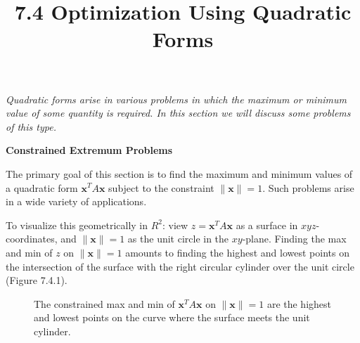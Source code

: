 \documentclass{article}
\title{7.4 Optimization Using Quadratic Forms}
\date{}
\author{}
\newcommand{\redheading}[1]{{\vspace{2mm}\noindent\Large\bfseries\color{red!55!black} #1\par}\vspace{2mm}}
\begin{document}
\maketitle

{\itshape\color{blue!45!black}
Quadratic forms arise in various problems in which the maximum or minimum value of
some quantity is required. In this section we will discuss some problems of this type.\par}

\vspace{2mm}

\redheading{Constrained Extremum Problems}

The primary goal of this section is to find the maximum and minimum values of a
quadratic form $\mathbf{x}^T A\mathbf{x}$ subject to the constraint $\|\mathbf{x}\|=1$.
Such problems arise in a wide variety of applications.

To visualize this geometrically in $R^2$: view $z=\mathbf{x}^T A\mathbf{x}$ as a surface
in $xyz$-coordinates, and $\|\mathbf{x}\|=1$ as the unit circle in the $xy$-plane. Finding
the max and min of $z$ on $\|\mathbf{x}\|=1$ amounts to finding the highest and lowest points
on the intersection of the surface with the right circular cylinder over the unit circle
(Figure 7.4.1).

\begin{figure}[ht]
\centering
{}
\caption{The constrained max and min of $\mathbf{x}^T A\mathbf{x}$ on $\|\mathbf{x}\|=1$
are the highest and lowest points on the curve where the surface meets the unit cylinder.}
\label{fig:741}
\end{figure}
\end{document}
